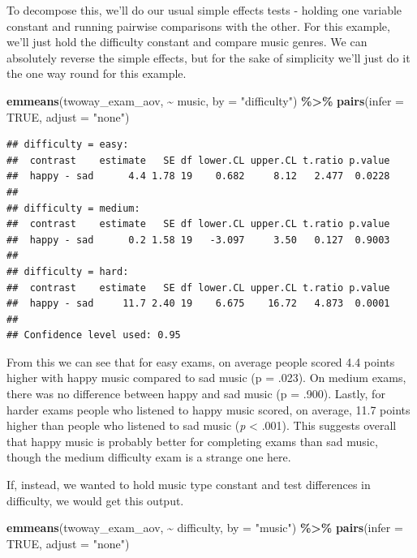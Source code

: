 \documentclass[
]{book}
\newenvironment{Shaded}{\begin{snugshade}}{\end{snugshade}}
\newcommand{\AttributeTok}[1]{\textcolor[rgb]{0.13,0.29,0.53}{#1}}
\newcommand{\ConstantTok}[1]{\textcolor[rgb]{0.56,0.35,0.01}{#1}}
\newcommand{\FunctionTok}[1]{\textcolor[rgb]{0.13,0.29,0.53}{\textbf{#1}}}
\newcommand{\NormalTok}[1]{#1}
\newcommand{\SpecialCharTok}[1]{\textcolor[rgb]{0.81,0.36,0.00}{\textbf{#1}}}
\newcommand{\StringTok}[1]{\textcolor[rgb]{0.31,0.60,0.02}{#1}}
\begin{document}
To decompose this, we'll do our usual simple effects tests - holding one variable constant and running pairwise comparisons with the other. For this example, we'll just hold the difficulty constant and compare music genres. We can absolutely reverse the simple effects, but for the sake of simplicity we'll just do it the one way round for this example.

\begin{Shaded}
\begin{Highlighting}[]
\FunctionTok{emmeans}\NormalTok{(twoway\_exam\_aov, }\SpecialCharTok{\textasciitilde{}}\NormalTok{ music, }\AttributeTok{by =} \StringTok{"difficulty"}\NormalTok{) }\SpecialCharTok{\%\textgreater{}\%}
  \FunctionTok{pairs}\NormalTok{(}\AttributeTok{infer =} \ConstantTok{TRUE}\NormalTok{, }\AttributeTok{adjust =} \StringTok{"none"}\NormalTok{)}
\end{Highlighting}
\end{Shaded}

\begin{verbatim}
## difficulty = easy:
##  contrast    estimate   SE df lower.CL upper.CL t.ratio p.value
##  happy - sad      4.4 1.78 19    0.682     8.12   2.477  0.0228
## 
## difficulty = medium:
##  contrast    estimate   SE df lower.CL upper.CL t.ratio p.value
##  happy - sad      0.2 1.58 19   -3.097     3.50   0.127  0.9003
## 
## difficulty = hard:
##  contrast    estimate   SE df lower.CL upper.CL t.ratio p.value
##  happy - sad     11.7 2.40 19    6.675    16.72   4.873  0.0001
## 
## Confidence level used: 0.95
\end{verbatim}

From this we can see that for easy exams, on average people scored 4.4 points higher with happy music compared to sad music (p = .023). On medium exams, there was no difference between happy and sad music (p = .900). Lastly, for harder exams people who listened to happy music scored, on average, 11.7 points higher than people who listened to sad music (\emph{p} \textless{} .001). This suggests overall that happy music is probably better for completing exams than sad music, though the medium difficulty exam is a strange one here.

If, instead, we wanted to hold music type constant and test differences in difficulty, we would get this output.

\begin{Shaded}
\begin{Highlighting}[]
\FunctionTok{emmeans}\NormalTok{(twoway\_exam\_aov, }\SpecialCharTok{\textasciitilde{}}\NormalTok{ difficulty, }\AttributeTok{by =} \StringTok{"music"}\NormalTok{) }\SpecialCharTok{\%\textgreater{}\%}
  \FunctionTok{pairs}\NormalTok{(}\AttributeTok{infer =} \ConstantTok{TRUE}\NormalTok{, }\AttributeTok{adjust =} \StringTok{"none"}\NormalTok{)}
\end{Highlighting}
\end{Shaded}
\end{document}
